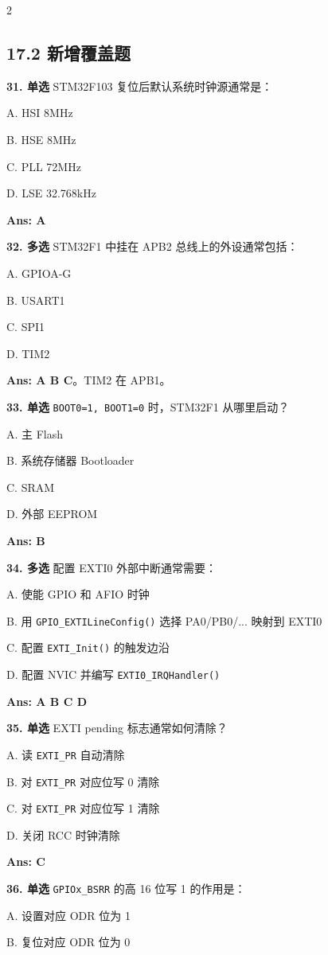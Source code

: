 \documentclass[UTF8,zihao=-5]{ctexart}
\begin{document}
\begin{multicols*}{2}
\subsection*{17.2 新增覆盖题}
\textbf{31. 单选} STM32F103 复位后默认系统时钟源通常是：\par
A. HSI 8MHz\par
B. HSE 8MHz\par
C. PLL 72MHz\par
D. LSE 32.768kHz\par
\textbf{Ans: A}\par
\textbf{32. 多选} STM32F1 中挂在 APB2 总线上的外设通常包括：\par
A. GPIOA-G\par
B. USART1\par
C. SPI1\par
D. TIM2\par
\textbf{Ans: A B C}。TIM2 在 APB1。\par
\textbf{33. 单选} \texttt{BOOT0=1, BOOT1=0} 时，STM32F1 从哪里启动？\par
A. 主 Flash\par
B. 系统存储器 Bootloader\par
C. SRAM\par
D. 外部 EEPROM\par
\textbf{Ans: B}\par
\textbf{34. 多选} 配置 EXTI0 外部中断通常需要：\par
A. 使能 GPIO 和 AFIO 时钟\par
B. 用 \texttt{GPIO\_EXTILineConfig()} 选择 PA0/PB0/... 映射到 EXTI0\par
C. 配置 \texttt{EXTI\_Init()} 的触发边沿\par
D. 配置 NVIC 并编写 \texttt{EXTI0\_IRQHandler()}\par
\textbf{Ans: A B C D}\par
\textbf{35. 单选} EXTI pending 标志通常如何清除？\par
A. 读 \texttt{EXTI\_PR} 自动清除\par
B. 对 \texttt{EXTI\_PR} 对应位写 0 清除\par
C. 对 \texttt{EXTI\_PR} 对应位写 1 清除\par
D. 关闭 RCC 时钟清除\par
\textbf{Ans: C}\par
\textbf{36. 单选} \texttt{GPIOx\_BSRR} 的高 16 位写 1 的作用是：\par
A. 设置对应 ODR 位为 1\par
B. 复位对应 ODR 位为 0\par

\end{multicols*}
\end{document}

